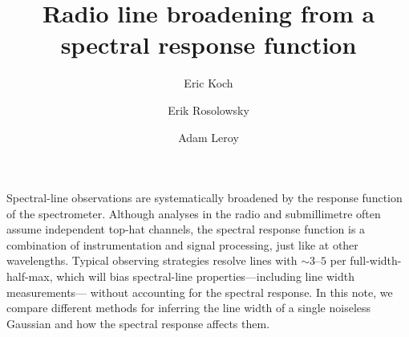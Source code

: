 \documentclass{rnaastex}
\begin{document}
\title{Radio line broadening from a spectral response function}

\author[0000-0001-9605-780X]{Eric Koch}
\author[0000-0002-5204-2259]{Erik Rosolowsky}

\author{Adam Leroy}


\keywords{}


\section{}


Spectral-line observations are systematically broadened by the response function of the spectrometer. Although analyses in the radio and submillimetre often assume independent top-hat channels, the spectral response function is a combination of instrumentation and signal processing, just like at other wavelengths.  Typical observing strategies resolve lines with $\sim3\mbox{--}5$ per full-width-half-max, which will bias spectral-line properties---including line width measurements--- without accounting for the spectral response.  In this note, we compare different methods for inferring the line width of a single noiseless Gaussian and how the spectral response affects them.

\end{document}
